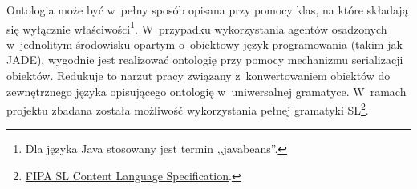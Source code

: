 \documentclass[a4paper,11pt]{article}
\begin{document}
Ontologia może być w~pełny sposób opisana przy pomocy klas, na które składają się wyłącznie właściwości\footnote{Dla języka Java stosowany jest termin ,,javabeans''.}. W~przypadku wykorzystania agentów osadzonych w~jednolitym środowisku opartym o~obiektowy język programowania (takim jak JADE), wygodnie jest realizować ontologię przy pomocy mechanizmu serializacji obiektów. Redukuje to narzut pracy związany z~konwertowaniem obiektów do zewnętrznego języka opisującego ontologię w~uniwersalnej gramatyce. W~ramach projektu zbadana została możliwość wykorzystania pełnej gramatyki SL\footnote{\href{http://www.fipa.org/specs/fipa00008/SC00008I.html}{FIPA SL Content Language Specification}.}.
\end{document}
